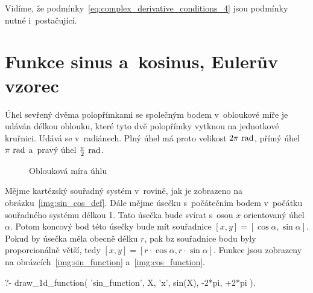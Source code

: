 Vidíme, že podmínky~\eqref{eq:complex_derivative_conditions_4} jsou podmínky nutné i~postačující.

\section{Funkce sinus a~kosinus, Eulerův vzorec}

Úhel sevřený dvěma polopřímkami se společným bodem v~obloukové míře je udáván délkou oblouku, které tyto dvě polopřímky vytknou na jednotkové kruřnici. Udává se v~radiánech. Plný úhel má proto velikost \(2 \pi \ \mathrm{rad}\), přímý úhel \(\pi \ \mathrm{rad}\) a~pravý úhel \(\frac{\pi}{2} \ \mathrm{rad}\).

\begin{figure}[ht]
\begin{center}
\caption{Oblouková míra úhlu}
\label{img:rad_def}
\end{center}
\end{figure}

Mějme kartézský souřadný systém v~rovině, jak je zobrazeno na obrázku~\ref{img:sin_cos_def}. Dále mějme úsečku s~počátečním bodem v~počátku souřadného systému délkou 1. Tato úsečka bude svírat s~osou \(x\) orientovaný úhel \(\alpha\). Potom koncový bod této úsečky bude mít souřadnice \([x, y] = [\cos \alpha, \sin \alpha]\). Pokud by úsečka měla obecně délku \(r\), pak bz souřadnice bodu byly proporcionálně větší, tedy \([x, y] = [r \cdot \cos \alpha, r \cdot \sin \alpha]\). Funkce jsou zobrazeny na obrázcích~\ref{img:sin_function} a~\ref{img:cos_function}.

\begin{prolog}
?-	draw_1d_function(
		'sin_function',
		X,
		'x',
		sin(X),
		-2*pi, +2*pi
	).				
\end{prolog}

